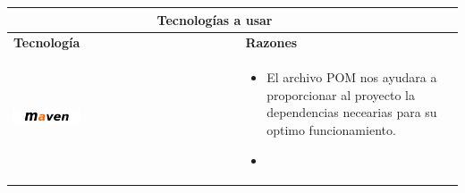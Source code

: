 \begin{table}[b!]
    \centering
    \vspace{33mm}
      \begin{tabular}{|p{2cm}|ll}
        \hline
        
        \multicolumn{2}{|c|}{{\bf Tecnologías a usar}} \\ 
        \hline
          \multicolumn{1}{|p{4cm}|}{{\bf Tecnología}} & 
		  \multicolumn{1}{p{10cm}|}{{\bf Razones}}\\

        \hline
          \multicolumn{1}{|p{5cm}|}{\includegraphics[width=0.3\textwidth]{images/maven}} & 
          \multicolumn{2}{p{10cm}|}{\begin{itemize}
          \vspace{-5mm}
         \item El archivo POM nos ayudara a proporcionar al proyecto la dependencias necearias para su optimo funcionamiento.
         \item      
      \end{itemize}} \\
        \hline


\end{tabular}
\end{table}

